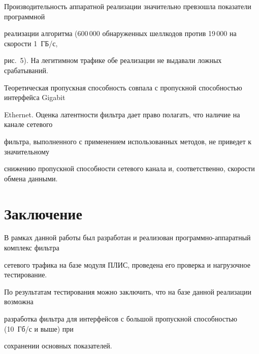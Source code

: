 Производительность аппаратной реализации значительно превзошла показатели программной 


реализации алгоритма (600\,000 обнаруженных шеллкодов против 19\,000 на скорости 1~ГБ/с, 


рис.~5). На легитимном трафике обе реализации не выдавали ложных срабатываний.





Теоретическая пропускная способность совпала с пропускной способностью интерфейса Gigabit 


Ethernet. Оценка латентности фильтра дает право полагать, что наличие на канале сетевого 


фильтра, выполненного с применением использованных методов, не приведет к значительному 


снижению пропускной способности сетевого канала и, соответственно, скорости обмена данными.








\section{Заключение}








В рамках данной работы был разработан и реализован программно-ап\-па\-рат\-ный комплекс фильтра 


сетевого трафика на базе модуля ПЛИС, проведена его проверка и нагрузочное тестирование.





По результатам тестирования можно заключить, что на базе данной реализации возможна 


разработка фильтра для интерфейсов с большой пропускной способностью (10~Гб/с и выше) при 


сохранении основных показателей.









